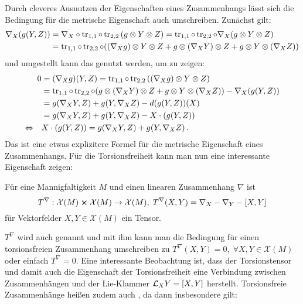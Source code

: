 \documentclass[../H_Analysis_main.tex]{subfiles}
\begin{document}
Durch cleveres Ausnutzen der Eigenschaften eines Zusammenhangs lässt sich die Bedingung für die metrische Eigenschaft auch umschreiben. Zunächst gilt:
\begin{align*}
\nabla_X \qty(g(Y, Z)) &= \nabla_X \circ \tr_{1, 1} \circ \tr_{2, 2} \qty(g \otimes Y \otimes Z) = \tr_{1, 1} \circ \tr_{2, 2} \circ \nabla_X \qty(g \otimes Y \otimes Z) 
\\
&= \tr_{1, 1} \circ \tr_{2, 2} \circ \qty(\qty(\nabla_X g) \otimes Y \otimes Z + g \otimes \qty(\nabla_X Y) \otimes Z + g \otimes Y \otimes \qty(\nabla_X Z))
\end{align*}
und umgestellt kann das genutzt werden, um zu zeigen:
\begin{align}
0 &= \qty(\nabla_X g)(Y, Z) = \tr_{1, 1} \circ \tr_{2, 2} \qty(\qty(\nabla_X g) \otimes Y \otimes Z)
\notag\\
&= \tr_{1, 1} \circ \tr_{2, 2} \circ \qty(g \otimes \qty(\nabla_X Y) \otimes Z + g \otimes Y \otimes \qty(\nabla_X Z)) - \nabla_X \qty(g(Y, Z))
\notag\\
&= g\qty(\nabla_X Y, Z) + g\qty(Y, \nabla_X Z) - d \qty(g(Y, Z))(X)
\notag\\
&= g\qty(\nabla_X Y, Z) + g\qty(Y, \nabla_X Z) - X \cdot \qty(g(Y, Z))
\notag\\
\Leftrightarrow \quad & X \cdot \qty(g(Y, Z)) = g\qty(\nabla_X Y, Z) + g\qty(Y, \nabla_X Z) \, .
\end{align}
Das ist eine etwas explizitere Formel für die metrische Eigenschaft eines Zusammenhangs. Für die Torsionsfreiheit kann man nun eine interessante Eigenschaft zeigen:
\begin{lemma}[Torsionstensor]
Für eine Mannigfaltigkeit $M$ und einen linearen Zusammenhang $\nabla$ ist
\begin{equation}
T^\nabla: \mathcal{X}(M) \cross \mathcal{X}(M) \rightarrow \mathcal{X}(M), \; T^\nabla(X, Y) = \nabla_X - \nabla_Y - \qty[X, Y]
\end{equation}
für Vektorfelder $X, Y \in \mathcal{X}(M)$ ein Tensor.
\end{lemma}
$T^\nabla$ wird auch  genannt und mit ihm kann man die Bedingung für einen torsionsfreien Zusammenhang umschreiben zu $T^\nabla(X, Y) = 0, \; \forall X, Y \in \mathcal{X}(M)$ oder einfach $T^\nabla = 0$. Eine interessante Beobachtung ist, dass der Torsionstensor und damit auch die Eigenschaft der Torsionsfreiheit eine Verbindung zwischen Zusammenhängen und der Lie-Klammer $\mathcal{L}_X Y = \qty[X, Y]$ herstellt. Torsionsfreie Zusammenhänge heißen zudem auch , da dann insbesondere gilt:
\end{document}

